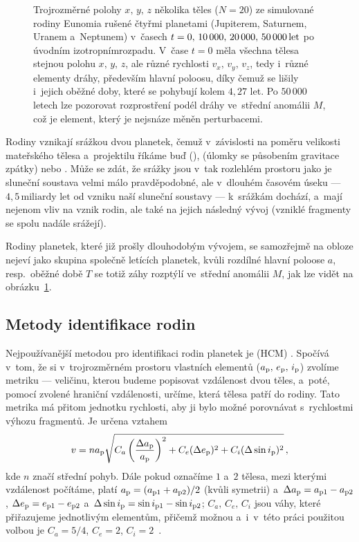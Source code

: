 \documentclass[A4paper, 12pt, oneside, openany]{book}
\begin{document}
\begin{figure}
	\caption{Trojrozměrné polohy $x,\,y,\,z$ několika těles ($N=20$) ze simulované rodiny Eunomia rušené čtyřmi planetami (Jupiterem, Saturnem, Uranem a~Neptunem) v~časech $t=0,\,10\,000,\,20\,000,\,50\,000\,{\rm let}$ po úvodním izotropním\protect\footnotemark rozpadu. V~čase $t=0$ měla všechna tělesa stejnou polohu $x,\,y,\,z$, ale různé rychlosti $v_x,\,v_y,\,v_z$, tedy i~různé elementy dráhy, především hlavní poloosu, díky čemuž se lišily i~jejich oběžné doby, které se pohybují kolem $4,27$ let. Po $50\,000$ letech lze pozorovat rozprostření podél dráhy ve~střední anomálii $M$, což je element, který je nejsnáze měněn perturbacemi.} \label{fig:trajec}
\end{figure}

Rodiny vznikají srážkou dvou planetek, čemuž v~závislosti na poměru velikosti mateřského tělesa a~projektilu říkáme buď  (),  (úlomky se působením gravitace  zpátky) nebo . Může se zdát, že srážky jsou v~tak rozlehlém prostoru jako je sluneční soustava velmi málo pravděpodobné, ale v~dlouhém časovém úseku --- $4,5\,\text{miliardy let}$ od vzniku naší sluneční soustavy --- k~srážkám dochází, a~mají nejenom vliv na vznik rodin, ale také na jejich následný vývoj (vzniklé fragmenty se spolu nadále srážejí).

Rodiny planetek, které již prošly dlouhodobým vývojem, se samozřejmě na obloze nejeví jako skupina společně letících planetek, kvůli rozdílné hlavní poloose $a$, resp.\ oběžné době $T$ se totiž záhy rozptýlí ve~střední anomálii $M$, jak lze vidět na obrázku~\ref{fig:trajec}.

\subsection{Metody identifikace rodin} \label{sec:metodyiden}
Nejpoužívanější metodou pro identifikaci rodin planetek je  (HCM) \cite{zappala90}. Spočívá v~tom, že si v~trojrozměrném prostoru vlastních elementů ($a_{\rm p},\,e_{\rm p},\,i_{\rm p}$) zvolíme metriku --- veličinu, kterou budeme popisovat vzdálenost dvou těles, a~poté, pomocí zvolené hraniční  vzdálenosti, určíme, která tělesa patří do rodiny. Tato metrika má přitom jednotku rychlosti, aby ji bylo možné porovnávat s~rychlostmi výhozu fragmentů. Je určena vztahem
\begin{align}
	v=na_{\rm p}\sqrt{C_a\left(\frac{\Delta a_{\rm p}}{a_{\rm p}}\right)^2+C_e(\Delta e_{\rm p})^2+C_i(\Delta \sin i_{\rm p})^2}\,,
\end{align}
kde $n$ značí střední pohyb. Dále pokud označíme $1$ a~$2$ tělesa, mezi kterými vzdálenost počítáme, platí $a_{\rm p}=(a_{{\rm p}1}+a_{{\rm p}2})/2$ (kvůli symetrii) a~$\Delta a_{\rm p}=a_{{\rm p}1}-a_{{\rm p}2}$, $\Delta e_{\rm p}=e_{{\rm p}1}-e_{{\rm p}2}$ a~$\Delta \sin i_{\rm p}=\sin i_{{\rm p}1}-\sin i_{{\rm p}2}$; $C_a,\,C_e,\,C_i$ jsou váhy, které přiřazujeme jednotlivým elementům, přičemž možnou a~i~v~této práci použitou volbou je $C_a=5/4$, $C_e=2$, $C_i=2$~\cite{zappala90}. 
\end{document}
